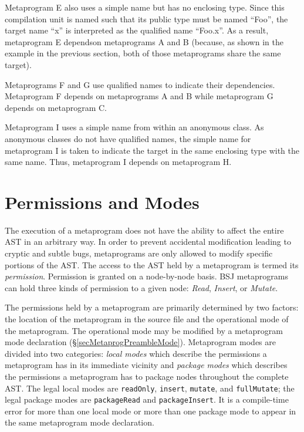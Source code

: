 \documentclass[a4paper,10pt]{report}
\newcommand{\refS}[1]{\hyperref[#1]{\S\ref{#1}}}
\newcommand{\vocab}[1]{\textit{#1}}
\begin{document}
Metaprogram E also uses a simple name but has no enclosing type.  Since this compilation unit is named such that its public type must be named ``Foo'', the target name ``x'' is interpreted as the qualified name ``Foo.x''.  As a result, metaprogram E dependson metaprograms A and B (because, as shown in the example in the previous section, both of those metaprograms share the same target).

Metaprograms F and G use qualified names to indicate their dependencies.  Metaprogram F depends on metaprograms A and B while metaprogram G depends on metaprogram C.

Metaprogram I uses a simple name from within an anonymous class.  As anonymous classes do not have qualified names, the simple name for metaprogram I is taken to indicate the target in the same enclosing type with the same name.  Thus, metaprogram I depends on metaprogram H.

\section{Permissions and Modes}
\label{secMetaprogModes}

The execution of a metaprogram does not have the ability to affect the entire AST in an arbitrary way.  In order to prevent accidental modification leading to cryptic and subtle bugs, metaprograms are only allowed to modify specific portions of the AST.  The access to the AST held by a metaprogram is termed its \vocab{permission}.  Permission is granted on a node-by-node basis.  BSJ metaprograms can hold three kinds of permission to a given node: \textit{Read}, \textit{Insert}, or \textit{Mutate}.

The permissions held by a metaprogram are primarily determined by two factors: the location of the metaprogram in the source file and the operational mode of the metaprogram.  The operational mode may be modified by a metaprogram mode declaration (\refS{secMetaprogPreambleMode}).  Metaprogram modes are divided into two categories: \vocab{local modes} which describe the permissions a metaprogram has in its immediate vicinity and \vocab{package modes} which describes the permissions a metaprogram has to package nodes throughout the complete AST.  The legal local modes are \verb`readOnly`, \verb`insert`, \verb`mutate`, and \verb`fullMutate`; the legal package modes are \verb`packageRead` and \verb`packageInsert`.  It is a compile-time error for more than one local mode or more than one package mode to appear in the same metaprogram mode declaration.
\end{document}

